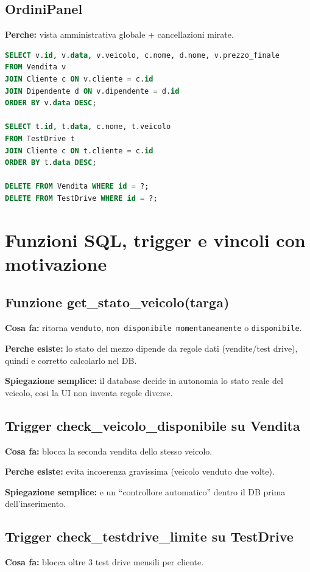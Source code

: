 \documentclass[12pt,a4paper]{article}
\begin{document}
\subsection{OrdiniPanel}
\textbf{Perche:} vista amministrativa globale + cancellazioni mirate.
\begin{lstlisting}[style=sqlstyle,language=SQL]
SELECT v.id, v.data, v.veicolo, c.nome, d.nome, v.prezzo_finale
FROM Vendita v
JOIN Cliente c ON v.cliente = c.id
JOIN Dipendente d ON v.dipendente = d.id
ORDER BY v.data DESC;

SELECT t.id, t.data, c.nome, t.veicolo
FROM TestDrive t
JOIN Cliente c ON t.cliente = c.id
ORDER BY t.data DESC;

DELETE FROM Vendita WHERE id = ?;
DELETE FROM TestDrive WHERE id = ?;
\end{lstlisting}

\section{Funzioni SQL, trigger e vincoli con motivazione}

\subsection{Funzione get\_stato\_veicolo(targa)}
\textbf{Cosa fa:}
ritorna \texttt{venduto}, \texttt{non disponibile momentaneamente} o \texttt{disponibile}.

\textbf{Perche esiste:}
lo stato del mezzo dipende da regole dati (vendite/test drive), quindi e corretto calcolarlo nel DB.

\textbf{Spiegazione semplice:}
il database decide in autonomia lo stato reale del veicolo, cosi la UI non inventa regole diverse.

\subsection{Trigger check\_veicolo\_disponibile su Vendita}
\textbf{Cosa fa:} blocca la seconda vendita dello stesso veicolo.

\textbf{Perche esiste:} evita incoerenza gravissima (veicolo venduto due volte).

\textbf{Spiegazione semplice:} e un ``controllore automatico'' dentro il DB prima dell'inserimento.

\subsection{Trigger check\_testdrive\_limite su TestDrive}
\textbf{Cosa fa:} blocca oltre 3 test drive mensili per cliente.
\end{document}
